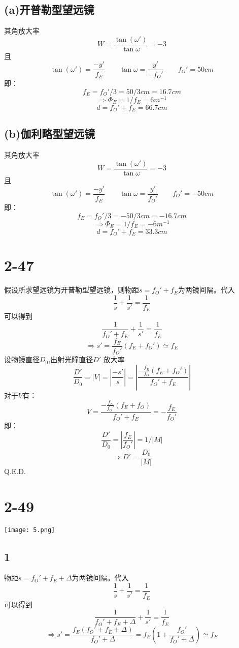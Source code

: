 \documentclass[UTF8,9pt]{ctexart}
\begin{document}
        \subsection*{(a)开普勒型望远镜}
            其角放大率$$W=\frac{\tan(\omega')}{\tan\omega}=-3$$
            且
            $$\tan(\omega')=\frac{-y'}{f_E}\qquad \tan\omega=\frac{y'}{-f_O'}\qquad f_O'=50cm$$
            即：
            $$f_E=f_O'/3=50/3cm=16.7cm$$
            $$\Rightarrow \Phi_E=1/f_E=6m^{-1}$$
            $$d=f_O'+f_E=66.7cm$$
        \subsection*{(b)伽利略型望远镜}
            其角放大率$$W=\frac{\tan(\omega')}{\tan\omega}=-3$$
            且
            $$\tan(\omega')=\frac{-y'}{f_E}\qquad \tan\omega=\frac{y'}{f_O'}\qquad f_O'=-50cm$$
            即：
            $$f_E=f_O'/3=-50/3cm=-16.7cm$$
            $$\Rightarrow \Phi_E=1/f_E=-6m^{-1}$$
            $$d=f_O'+f_E=33.3cm$$
    \section{2-47}
        假设所求望远镜为开普勒型望远镜，则物距$s=f_O'+f_E$为两镜间隔。代入
        $$\frac{1}{s}+\frac{1}{s'}=\frac{1}{f_E}$$
        可以得到
        $$\frac{1}{f_O'+f_E}+\frac{1}{s'}=\frac{1}{f_E}$$
        $$\Rightarrow s'=\frac{f_E}{f_O'}(f_E+f_O') \simeq f_E$$
        设物镜直径$D_0$,出射光瞳直径$D'$
        放大率$$\frac{D'}{D_0}=|V|=\left|\frac{-s'}{s}\right|=\left|\frac{-\frac{f_E}{f_O}(f_E+f_O')}{f_O'+f_E}\right|$$
        对于$V$有：
        $$V=\frac{-\frac{f_E}{f_O'}(f_E+f_O)}{f_O'+f_E}=-\frac{f_E}{f_O'}$$
        即：
        $$\frac{D'}{D_0}=\left|\frac{f_E}{f_O'}\right|=1/|M|$$
        $$\Rightarrow D'=\frac{D_0}{|M|}$$
        Q.E.D.
    \section{2-49}
        \texttt{[image: 5.png]}\\
        \subsection*{1}
            物距$s=f_O'+f_E+\Delta$为两镜间隔。代入
            $$\frac{1}{s}+\frac{1}{s'}=\frac{1}{f_E}$$
            可以得到
            $$\frac{1}{f_O'+f_E+\Delta}+\frac{1}{s'}=\frac{1}{f_E}$$
            $$\Rightarrow s'=\frac{f_E(f_O'+f_E+\Delta)}{f_O'+\Delta}=f_E(1+\frac{f_O'}{f_O'+\Delta}) \simeq f_E$$
\end{document}
